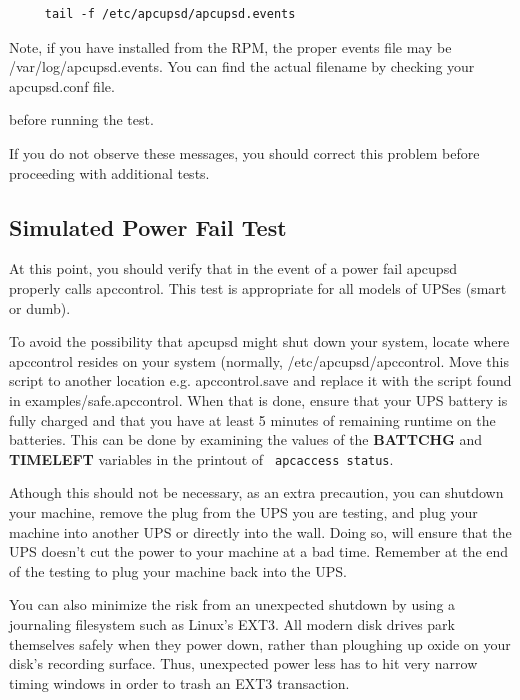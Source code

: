 \footnotesize
\begin{verbatim}
     tail -f /etc/apcupsd/apcupsd.events
\end{verbatim}
\normalsize

Note, if you have installed from the RPM, the proper events file may be
/var/log/apcupsd.events. You can find the actual filename by checking your
apcupsd.conf file.  

before running the test.  

If you do not observe these messages, you should correct this problem before
proceeding with additional tests. 

\label{Simulated-Power-Fail-Test}

\subsection*{Simulated Power Fail Test}

\label{index-Testing_002c-Simulate-Power-Fail-93}
\label{index-Simulate-Power-Fail-Test-94}
At this point, you should verify that in the event of a power fail apcupsd
properly calls apccontrol. This test is appropriate for all models of UPSes
(smart or dumb).  

To avoid the possibility that apcupsd might shut down your system, locate
where apccontrol resides on your system (normally, /etc/apcupsd/apccontrol.
Move this script to another location e.g. apccontrol.save and replace it with
the script found in examples/safe.apccontrol. When that is done, ensure that
your UPS battery is fully charged and that you have at least 5 minutes of
remaining runtime on the batteries. This can be done by examining the values
of the {\bf BATTCHG} and {\bf TIMELEFT} variables in the printout of {\tt
apcaccess status}.  

Athough this should not be necessary, as an extra precaution, you can shutdown
your machine, remove the plug from the UPS you are testing, and plug your
machine into another UPS or directly into the wall. Doing so, will ensure that
the UPS doesn't cut the power to your machine at a bad time. Remember at the
end of the testing to plug your machine back into the UPS.  

You can also minimize the risk from an unexpected shutdown by using a
journaling filesystem such as Linux's EXT3.  All modern disk drives park
themselves safely when they power down, rather than ploughing up oxide on your
disk's recording surface.  Thus, unexpected power less has to hit very narrow
timing windows in order to trash an EXT3 transaction.  

